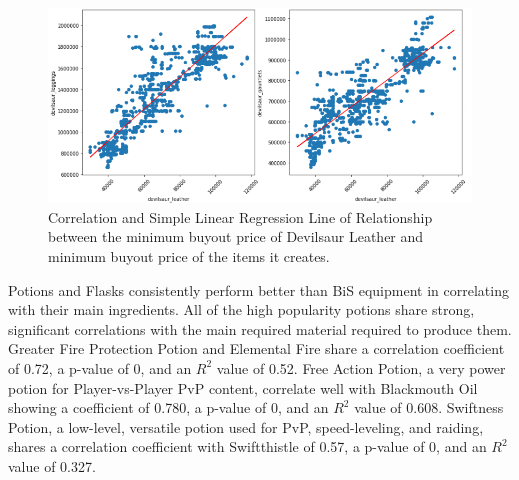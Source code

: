 \documentclass[sigconf]{acmart}
\begin{document}
\begin{figure}[h]
\centering
\includegraphics[width=\linewidth]{devilsuar_leather_corr}
\caption{Correlation and Simple Linear Regression Line of Relationship between the minimum buyout price of Devilsaur Leather and minimum buyout price of the items it creates.}
\end{figure}

Potions and Flasks consistently perform better than BiS equipment in correlating with their main ingredients. All of the high popularity potions share strong, significant correlations with the main required material required to produce them. Greater Fire Protection Potion and Elemental Fire share a correlation coefficient of 0.72, a p-value of 0, and an \( R^2 \) value of 0.52. Free Action Potion, a very power potion for Player-vs-Player PvP content, correlate well with Blackmouth Oil showing a coefficient of 0.780, a p-value of 0, and an \( R^2 \) value of 0.608. Swiftness Potion, a low-level, versatile potion used for PvP, speed-leveling, and raiding, shares a correlation coefficient with Swiftthistle of 0.57, a p-value of 0, and an \( R^2 \) value of 0.327.
\end{document}
